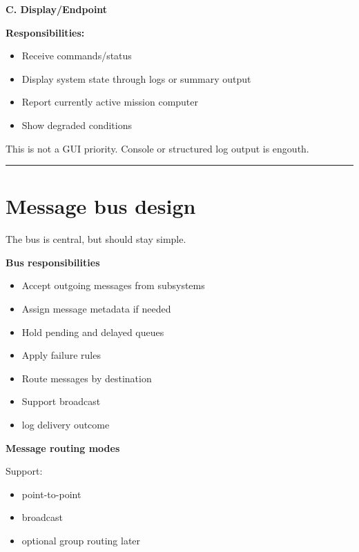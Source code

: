 \documentclass{report}
\begin{document}
\textbf{C. Display/Endpoint}

\textbf{Responsibilities:} 
\begin{itemize}
   \item Receive commands/status
   \item Display system state through logs or summary output
   \item Report currently active mission computer
   \item Show degraded conditions
\end{itemize}

This is not a GUI priority.  Console or structured log output is engouth.

\begin{center}
\rule{0.9\textwidth}{1pt}
\end{center}
\section{Message bus design}

The bus is central, but should stay simple. 

\textbf{Bus responsibilities}
\begin{itemize}
   \item Accept outgoing messages from subsystems
   \item Assign message metadata if needed
   \item Hold pending and delayed queues
   \item Apply failure rules
   \item Route messages by destination
   \item Support broadcast
   \item log delivery outcome
\end{itemize}

\textbf{Message routing modes}

\vspace{\baselineskip} Support:
\begin{itemize}
   \item point-to-point
   \item broadcast
   \item optional group routing later
\end{itemize}
\end{document}
